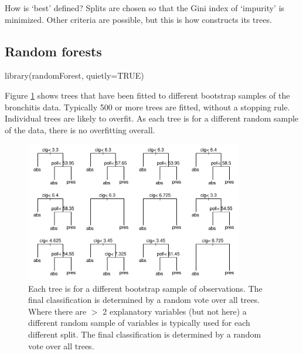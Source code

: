 How is `best' defined? Splits are chosen so that the Gini index of
`impurity' is minimized.  Other criteria are possible, but this is
how  constructs its trees.

\subsection{Random forests}\label{ss:rf}

\begin{Schunk}
\begin{Sinput}
library(randomForest, quietly=TRUE)
\end{Sinput}
\end{Schunk}

Figure \ref{fig:brontrees} shows trees that have been fitted to
different bootstrap samples of the bronchitis data.  Typically 500 or
more trees are fitted, without a stopping rule.  Individual trees are
likely to overfit.  As each tree is for a different random sample of
the data, there is no overfitting overall.

\begin{figure}
\begin{Schunk}


\centerline{\includegraphics[width=0.85\textwidth]{figs/9-rf-x-bronchit-1} }

\end{Schunk}
\caption{Each tree is for a different bootstrap sample of
  observations.  The final classification is determined by a random
  vote over all trees.  Where there are $>$ 2 explanatory variables
  (but not here) a different random sample of variables is typically
  used for each different split. The final classification is
  determined by a random vote over all trees.}\label{fig:brontrees}
\end{figure}

